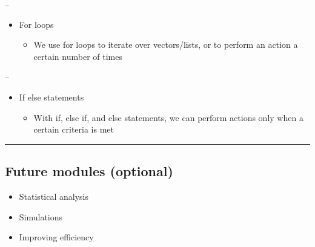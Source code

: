 \documentclass[]{article}
\providecommand{\tightlist}{%
  \setlength{\itemsep}{0pt}\setlength{\parskip}{0pt}}
\begin{document}
--

\begin{itemize}
\tightlist
\item
  For loops

  \begin{itemize}
  \tightlist
  \item
    We use for loops to iterate over vectors/lists, or to perform an
    action a certain number of times
  \end{itemize}
\end{itemize}

--

\begin{itemize}
\tightlist
\item
  If else statements

  \begin{itemize}
  \tightlist
  \item
    With if, else if, and else statements, we can perform actions only
    when a certain criteria is met
  \end{itemize}
\end{itemize}

\begin{center}\rule{0.5\linewidth}{\linethickness}\end{center}

\hypertarget{future-modules-optional}{%
\subsection{Future modules (optional)}\label{future-modules-optional}}

\begin{itemize}
\tightlist
\item
  Statistical analysis
\item
  Simulations
\item
  Improving efficiency
\end{itemize}
\end{document}
